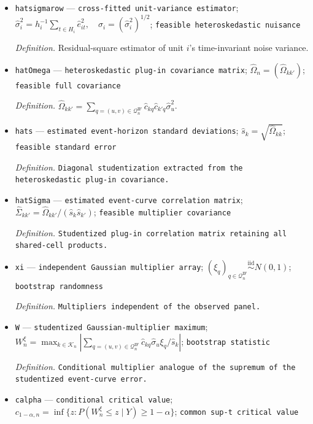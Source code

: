 \documentclass{article}
\begin{document}
\begin{itemize}
  \item \texttt{hatsigmarow} --- \texttt{cross-\allowbreak{}fitted unit-\allowbreak{}variance estimator}; \(\widehat\sigma_i^2=h_i^{-1}\sum_{t\in H_i}\widehat e_{it}^2,\quad \widehat\sigma_i=(\widehat\sigma_i^2)^{1/2}\); \texttt{feasible heteroskedastic nuisance}
  \par\smallskip\noindent\emph{Definition.} Residual-square estimator of unit \(i\)'s time-invariant noise variance.
  \item \texttt{hatOmega} --- \texttt{heteroskedastic plug-\allowbreak{}in covariance matrix}; \(\widehat\Omega_n=(\widehat\Omega_{kk'})\); \texttt{feasible full covariance}
  \par\smallskip\noindent\emph{Definition.} \(\widehat\Omega_{kk'}=\sum_{q=(u,v)\in\mathcal Q_n^{\mathrm{IF}}}\widehat c_{kq}\widehat c_{k'q}\widehat\sigma_u^2\).
  \item \texttt{hats} --- \texttt{estimated event-\allowbreak{}horizon standard deviations}; \(\widehat s_k=\sqrt{\widehat\Omega_{kk}}\); \texttt{feasible standard error}
  \par\smallskip\noindent\emph{Definition.} \texttt{Diagonal studentization extracted from the heteroskedastic plug-\allowbreak{}in covariance.}
  \item \texttt{hatSigma} --- \texttt{estimated event-\allowbreak{}curve correlation matrix}; \(\widehat\Sigma_{kk'}=\widehat\Omega_{kk'}/(\widehat s_k\widehat s_{k'})\); \texttt{feasible multiplier covariance}
  \par\smallskip\noindent\emph{Definition.} \texttt{Studentized plug-\allowbreak{}in correlation matrix retaining all shared-\allowbreak{}cell products.}
  \item \texttt{xi} --- \texttt{independent Gaussian multiplier array}; \((\xi_q)_{q\in\mathcal Q_n^{\mathrm{IF}}}\stackrel{\mathrm{iid}}{\sim}N(0,1)\); \texttt{bootstrap randomness}
  \par\smallskip\noindent\emph{Definition.} \texttt{Multipliers independent of the observed panel.}
  \item \texttt{W} --- \texttt{studentized Gaussian-\allowbreak{}multiplier maximum}; \(W_n^\xi=\max_{k\in\mathcal K_n}|\sum_{q=(u,v)\in\mathcal Q_n^{\mathrm{IF}}}\widehat c_{kq}\widehat\sigma_u\xi_q/\widehat s_k|\); \texttt{bootstrap statistic}
  \par\smallskip\noindent\emph{Definition.} \texttt{Conditional multiplier analogue of the supremum of the studentized event-\allowbreak{}curve error.}
  \item \texttt{calpha} --- \texttt{conditional critical value}; \(c_{1-\alpha,n}=\inf\{z:P(W_n^\xi\le z\mid Y)\ge1-\alpha\}\); \texttt{common sup-\allowbreak{}t critical value}

\end{itemize}
\end{document}

